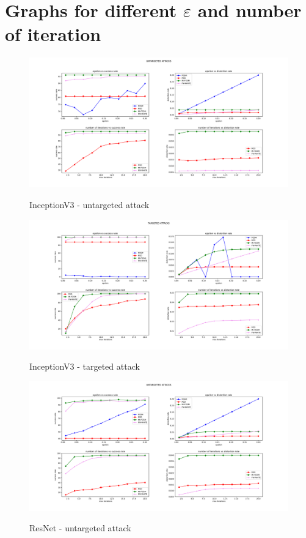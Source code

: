 \documentclass[10pt,twocolumn,letterpaper, english]{article}
\theoremstyle{definition}
\theoremstyle{plain}
\theoremstyle{plain}
\theoremstyle{plain}
\theoremstyle{plain}
\theoremstyle{remark}
\theoremstyle{remark}
\theoremstyle{definition}
\theoremstyle{definition}
\theoremstyle{definition}
\theoremstyle{definition}
\renewcommand{\epsilon}{\varepsilon}
\begin{document}
\appendix
\section{Graphs for different $\epsilon$ and number of iteration} \label{appendix-fig}


\begin{figure}[ht]
  \centering
  \includegraphics[width=\textwidth]{./Images/inceptionv3_untargeted_grid.pdf}\\
  \caption{InceptionV3 - untargeted attack } \label{incV3-unt}
\end{figure}

\begin{figure}[ht]
  \centering
  \includegraphics[width=\textwidth]{./Images/InceptionV3-targeted_grid.pdf}\\
  \caption{InceptionV3 - targeted attack } \label{incV3-t}
\end{figure}

\begin{figure}[ht]
  \centering
  \includegraphics[width=\textwidth]{./Images/ResNet-untargeted_grid.pdf}\\
  \caption{ResNet - untargeted attack } \label{res-unt}
\end{figure}
\end{document}
